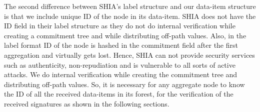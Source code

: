 	The second difference between SHIA's label structure and our data-item structure is that we include unique ID of the node in its data-item.
	SHIA does not have the ID field in their label structure as they do not do internal verification while creating a commitment tree and while distributing off-path values.
	Also, in the label format ID of the node is hashed in the commitment field after the first aggregation and virtually gets lost.
	Hence, SHIA can not provide security services such as authenticity, non-repudiation and is vulnerable to all sorts of active attacks.
	We do internal verification while creating the commitment tree and distributing off-path values.
	So, it is necessary for any aggregate node to know the ID of all the received data-items in its forest, for the verification of the received signatures as shown in the following sections.

